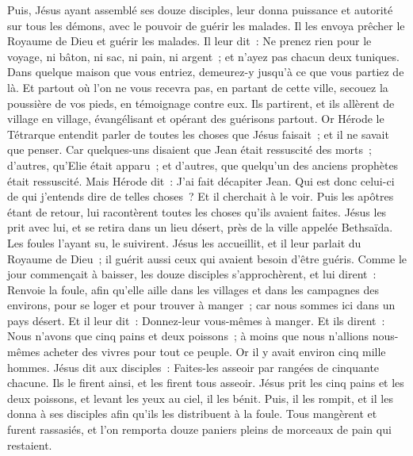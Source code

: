 \begin{multicols}{2}
\VerseOne{}Puis, Jésus ayant assemblé ses douze disciples, leur donna puissance et autorité sur tous les démons, avec le pouvoir de guérir les malades.
Il les envoya prêcher le Royaume de Dieu et guérir les malades.
Il leur dit~: Ne prenez rien pour le voyage, ni bâton, ni sac, ni pain, ni argent~; et n'ayez pas chacun deux tuniques.
Dans quelque maison que vous entriez, demeurez-y jusqu'à ce que vous partiez de là.
Et partout où l'on ne vous recevra pas, en partant de cette ville, secouez la poussière de vos pieds, en témoignage contre eux.
Ils partirent, et ils allèrent de village en village, évangélisant et opérant des guérisons partout.
Or Hérode le Tétrarque entendit parler de toutes les choses que Jésus faisait~; et il ne savait que penser. Car quelques-uns disaient que Jean était ressuscité des morts~;
d'autres, qu'Elie était apparu~; et d'autres, que quelqu'un des anciens prophètes était ressuscité.
Mais Hérode dit~: J'ai fait décapiter Jean. Qui est donc celui-ci de qui j'entends dire de telles choses~? Et il cherchait à le voir.
Puis les apôtres étant de retour, lui racontèrent toutes les choses qu'ils avaient faites. Jésus les prit avec lui, et se retira dans un lieu désert, près de la ville appelée Bethsaïda.
Les foules l'ayant su, le suivirent. Jésus les accueillit, et il leur parlait du Royaume de Dieu~; il guérit aussi ceux qui avaient besoin d'être guéris.
Comme le jour commençait à baisser, les douze disciples s'approchèrent, et lui dirent~: Renvoie la foule, afin qu'elle aille dans les villages et dans les campagnes des environs, pour se loger et pour trouver à manger~; car nous sommes ici dans un pays désert.
Et il leur dit~: Donnez-leur vous-mêmes à manger. Et ils dirent~: Nous n'avons que cinq pains et deux poissons~; à moins que nous n'allions nous-mêmes acheter des vivres pour tout ce peuple.
Or il y avait environ cinq mille hommes. Jésus dit aux disciples~: Faites-les asseoir par rangées de cinquante chacune.
Ils le firent ainsi, et les firent tous asseoir.
Jésus prit les cinq pains et les deux poissons, et levant les yeux au ciel, il les bénit. Puis, il les rompit, et il les donna à ses disciples afin qu'ils les distribuent à la foule.
Tous mangèrent et furent rassasiés, et l'on remporta douze paniers pleins de morceaux de pain qui restaient.

\end{multicols}
